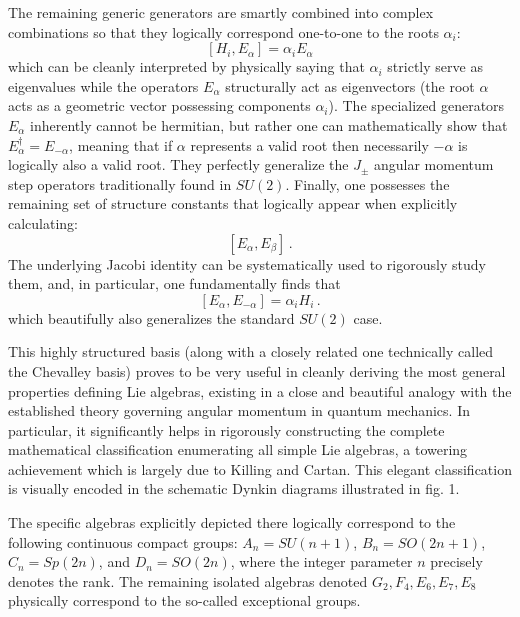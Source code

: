 The remaining generic generators are smartly combined into complex combinations so that they logically correspond one-to-one to the roots \(\alpha_i\):
\begin{equation} \label{eq:root_eigenvalue}
    [H_i, E_\alpha] = \alpha_i E_\alpha
\end{equation}
which can be cleanly interpreted by physically saying that \(\alpha_i\) strictly serve as eigenvalues while the operators \(E_\alpha\) structurally act as eigenvectors (the root \(\alpha\) acts as a geometric vector possessing components \(\alpha_i\)). The specialized generators \(E_\alpha\) inherently cannot be hermitian, but rather one can mathematically show that \(E_\alpha^\dagger = E_{-\alpha}\), meaning that if \(\alpha\) represents a valid root then necessarily \(-\alpha\) is logically also a valid root. They perfectly generalize the \(J_\pm\) angular momentum step operators traditionally found in \(SU(2)\). Finally, one possesses the remaining set of structure constants that logically appear when explicitly calculating:
\begin{equation} \label{eq:e_alpha_beta}
    [E_\alpha, E_\beta] \, .
\end{equation}
The underlying Jacobi identity can be systematically used to rigorously study them, and, in particular, one fundamentally finds that
\begin{equation} \label{eq:e_alpha_minus_alpha}
    [E_\alpha, E_{-\alpha}] = \alpha_i H_i \, .
\end{equation}
which beautifully also generalizes the standard \(SU(2)\) case.

This highly structured basis (along with a closely related one technically called the Chevalley basis) proves to be very useful in cleanly deriving the most general properties defining Lie algebras, existing in a close and beautiful analogy with the established theory governing angular momentum in quantum mechanics. In particular, it significantly helps in rigorously constructing the complete mathematical classification enumerating all simple Lie algebras, a towering achievement which is largely due to Killing and Cartan. This elegant classification is visually encoded in the schematic Dynkin diagrams illustrated in fig. 1.


The specific algebras explicitly depicted there logically correspond to the following continuous compact groups: \(A_n = SU(n+1)\), \(B_n = SO(2n+1)\), \(C_n = Sp(2n)\), and \(D_n = SO(2n)\), where the integer parameter \(n\) precisely denotes the rank. The remaining isolated algebras denoted \(G_2, F_4, E_6, E_7, E_8\) physically correspond to the so-called exceptional groups.

